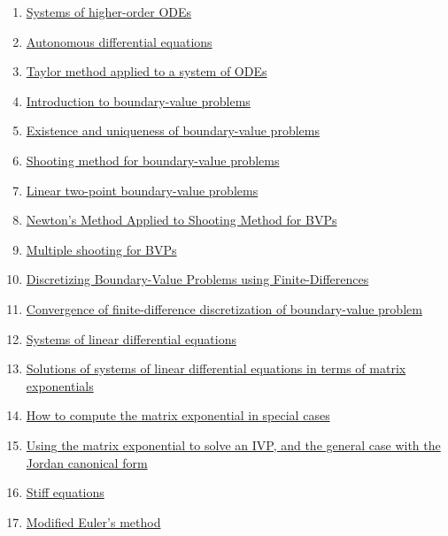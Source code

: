 \documentclass[11pt]{article}
\begin{document}
\begin{enumerate}
	\item \href{https://mp.weixin.qq.com/s/pnFk-33Wf8l39MWaJVnQ5A}{Systems of higher-order ODEs}	%
	\item \href{https://mp.weixin.qq.com/s/j00BLLv81C7_ZVnpDghpfw}{Autonomous differential equations}	%
	\item \href{https://mp.weixin.qq.com/s/Db0eENKvVroT8DwjiQifwg}{Taylor method applied to a system of ODEs}	%
	\item \href{https://mp.weixin.qq.com/s/1cl-1xZsxqRaT1uxpRfEzQ}{Introduction to boundary-value problems}	%
	\item \href{https://mp.weixin.qq.com/s/UF2ds4vHhcvtduZqSqkc7A}{Existence and uniqueness of boundary-value problems}	%
	\item \href{https://mp.weixin.qq.com/s/LxP6jvzCYlGUSBlfQ7lqmg}{Shooting method for boundary-value problems}	%
	\item \href{https://mp.weixin.qq.com/s/ySE91L1kyNx25kFfYrH3AA}{Linear two-point boundary-value problems}	%
	\item \href{https://mp.weixin.qq.com/s/rRIMqJdL158jn9laAzCfAQ}{Newton's Method Applied to Shooting Method for BVPs}	%
	\item \href{https://mp.weixin.qq.com/s/vUiDZNDJLyE96-LRq_PBqg}{Multiple shooting for BVPs}	%
	\item \href{https://mp.weixin.qq.com/s/gA7qCyBGOxOK1WVXMh9_yQ}{Discretizing Boundary-Value Problems using Finite-Differences}	%
	\item \href{https://mp.weixin.qq.com/s/2qg09rNlqcUGUwJNbUnwvg}{Convergence of finite-difference discretization of boundary-value problem}	%
	\item \href{https://mp.weixin.qq.com/s/CKN36ozJNQ4modr8SOiQxg}{Systems of linear differential equations}	%
	\item \href{https://mp.weixin.qq.com/s/dnWxJxjr1Ox-depgfL8ZPg}{Solutions of systems of linear differential equations in terms of matrix exponentials}	%
	\item \href{https://mp.weixin.qq.com/s/fJtLxrK2uJ_uLI4H842M3A}{How to compute the matrix exponential in special cases}	%
	\item \href{https://mp.weixin.qq.com/s/MAOdAm_2rcqhR9HjP3Iy-g}{Using the matrix exponential to solve an IVP, and the general case with the Jordan canonical form}	%
	\item \href{https://mp.weixin.qq.com/s/qaUqWfBvLRoMJ7xMXFghJQ}{Stiff equations}	%
	\item \href{https://mp.weixin.qq.com/s/3lJH0lIsi2tBNsp9fL9zSA}{Modified Euler's method}	%

\end{enumerate}
\end{document}
